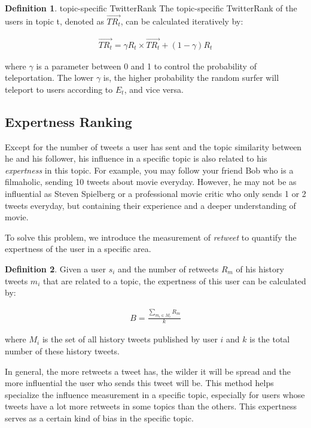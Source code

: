 \documentclass[conference]{IEEEtran}
\theoremstyle{definition}
\newtheorem{definition}{Definition}
\begin{document}
\theoremstyle{definition}
\begin{definition}{topic-specific TwitterRank}
	The topic-specific TwitterRank of the users in topic t, denoted as $\vec{TR_t}$, can be calculated iteratively by:
	
	\begin{align}
	\vec{TR_t} = \gamma R_t \times \vec{TR_t} + (1 - \gamma)R_t
	\end{align}
	
	where $\gamma$ is a parameter between 0 and 1 to control the probability of teleportation. The lower $\gamma$ is, the higher probability the random surfer will teleport to users according to $E_t$, and vice versa. 
	
\end{definition}


\subsection{Expertness Ranking}

Except for the number of tweets a user has sent and the topic similarity between he and his follower, his influence in a specific topic is also related to his \textit{expertness} in this topic. For example, you may follow your friend Bob who is a filmaholic, sending 10 tweets about movie everyday. However, he may not be as influential as Steven Spielberg or a professional movie critic who only sends 1 or 2 tweets everyday, but containing their experience and a deeper understanding of movie.

To solve this problem, we introduce the measurement of \textit{retweet} to quantify the expertness of the user in a specific area. 

\theoremstyle{definition}
\begin{definition}{Given a user $s_{i}$ and the number of retweets $R_{m}$ of his history tweets $m_{i}$ that are related to a topic, the expertness of this user can be calculated by:}

	\begin{align}
	B = \frac{\sum_{m_i\in M_i} R_m}{k} 
	\end{align}
	
	 where $M_i$ is the set of all history tweets published by user $i$ and $k$ is the total number of these history tweets.
\end{definition}

In general, the more retweets a tweet has, the wilder it will be spread and the more influential the user who sends this tweet will be. This method helps specialize the influence measurement in a specific topic, especially for users whose tweets have a lot more retweets in some topics than the others. This expertness serves as a certain kind of bias in the specific topic.
\end{document}
